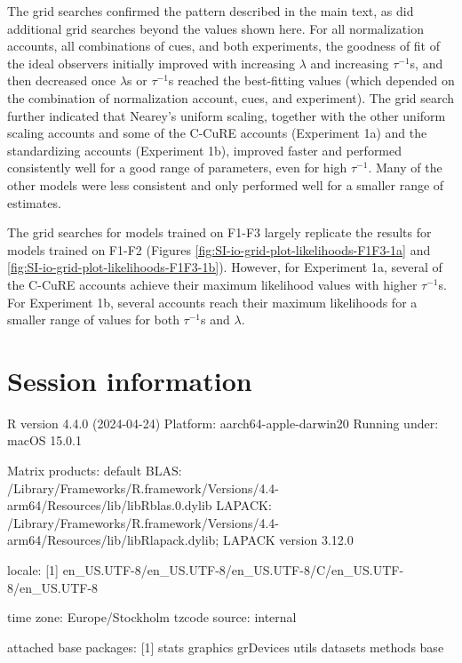 \documentclass[preprint]{JASA}
\begin{document}
The grid searches confirmed the pattern described in the main text, as did additional grid searches beyond the values shown here. For all normalization accounts, all combinations of cues, and both experiments, the goodness of fit of the ideal observers initially improved with increasing \(\lambda\) and increasing \(\tau^{-1}\)s, and then decreased once \(\lambda\)s or \(\tau^{-1}\)s reached the best-fitting values (which depended on the combination of normalization account, cues, and experiment). The grid search further indicated that Nearey's uniform scaling, together with the other uniform scaling accounts and some of the C-CuRE accounts (Experiment 1a) and the standardizing accounts (Experiment 1b), improved faster and performed consistently well for a good range of parameters, even for high \(\tau^{-1}\). Many of the other models were less consistent and only performed well for a smaller range of estimates.

The grid searches for models trained on F1-F3 largely replicate the results for models trained on F1-F2 (Figures \ref{fig:SI-io-grid-plot-likelihoods-F1F3-1a} and \ref{fig:SI-io-grid-plot-likelihoods-F1F3-1b}). However, for Experiment 1a, several of the C-CuRE accounts achieve their maximum likelihood values with higher \(\tau^{-1}\)s. For Experiment 1b, several accounts reach their maximum likelihoods for a smaller range of values for both \(\tau^{-1}\)s and \(\lambda\).

\newpage

\section{Session information}\label{session-information}

\footnotesize

R version 4.4.0 (2024-04-24)
Platform: aarch64-apple-darwin20
Running under: macOS 15.0.1

Matrix products: default
BLAS: /Library/Frameworks/R.framework/Versions/4.4-arm64/Resources/lib/libRblas.0.dylib
LAPACK: /Library/Frameworks/R.framework/Versions/4.4-arm64/Resources/lib/libRlapack.dylib; LAPACK version 3.12.0

locale:
{[}1{]} en\_US.UTF-8/en\_US.UTF-8/en\_US.UTF-8/C/en\_US.UTF-8/en\_US.UTF-8

time zone: Europe/Stockholm
tzcode source: internal

attached base packages:
{[}1{]} stats graphics grDevices utils datasets methods base
\end{document}
